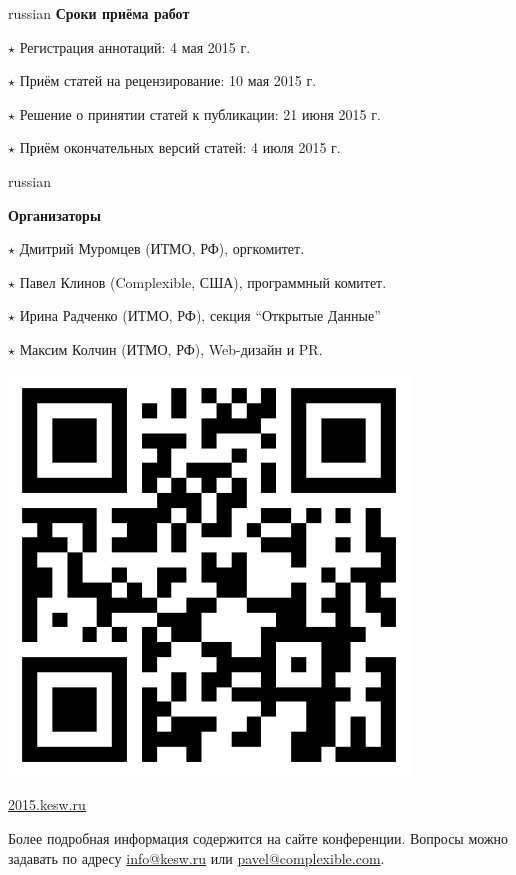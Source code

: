 \documentclass[a4paper, 10pt]{article}
\renewcommand{\skip}{\vspace{1ex}}
\renewcommand{\bullet}{\ensuremath{\star} }
\begin{document}
\begin{otherlanguage*}{russian}
\noindent\textbf{Сроки приёма работ}

\skip

\noindent
\bullet Регистрация аннотаций: 4 мая 2015 г.

\noindent
\bullet Приём статей на рецензирование: 10 мая 2015 г.

\noindent
\bullet Решение о принятии статей к публикации: 21 июня 2015 г.

\noindent
\bullet Приём окончательных версий статей: 4 июля 2015 г.

\skip

\hspace*{-\parindent}%
\begin{minipage}{.80\textwidth}
\begin{otherlanguage*}{russian}

\textbf{Организаторы}

\skip

\noindent
\bullet Дмитрий Муромцев (ИТМО, РФ), оргкомитет.

\bullet Павел Клинов (Complexible, США), программный комитет.

\bullet Ирина Радченко (ИТМО, РФ), секция ``Открытые Данные'' 

\bullet Максим Колчин (ИТМО, РФ), Web-дизайн и PR.

\end{otherlanguage*}
\end{minipage}
\begin{minipage}{.20\textwidth}
\includegraphics[width=0.8\textwidth]{qrcode}

\footnotesize{\url{2015.kesw.ru}}
\end{minipage}
\hfill


\vfill

\noindent Более подробная информация содержится на сайте конференции. Вопросы можно задавать по адресу \url{info@kesw.ru} 
или \url{pavel@complexible.com}.



\end{otherlanguage*}
\end{document}
